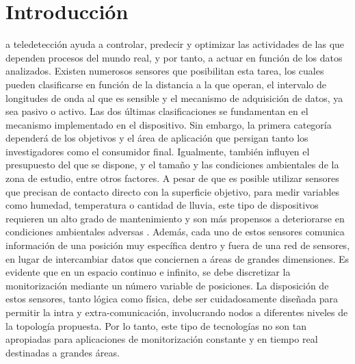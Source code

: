 \setchapterpreamble[u]{\margintoc}
\chapter*{Introducción}
\label{sec:introduction_spanish}

\lettrine[findent=0pt, lines=3]{}{ }a teledetección ayuda a controlar, predecir y optimizar las actividades de las que dependen procesos del mundo real, y por tanto, a actuar en función de los datos analizados. Existen numerosos sensores que posibilitan esta tarea, los cuales pueden clasificarse en función de la distancia a la que operan, el intervalo de longitudes de onda al que es sensible y el mecanismo de adquisición de datos, ya sea pasivo o activo. Las dos últimas clasificaciones se fundamentan en el mecanismo implementado en el dispositivo. Sin embargo, la primera categoría dependerá de los objetivos y el área de aplicación que persigan tanto los investigadores como el consumidor final. Igualmente, también influyen el presupuesto del que se dispone, y el tamaño y las condiciones ambientales de la zona de estudio, entre otros factores. A pesar de que es posible utilizar sensores que precisan de contacto directo con la superficie objetivo, para medir variables como humedad, temperatura o cantidad de lluvia, este tipo de dispositivos requieren un alto grado de mantenimiento y son más propensos a deteriorarse en condiciones ambientales adversas \cite{silva_low-cost_2019, morais_versatile_2021}. Además, cada uno de estos sensores comunica información de una posición muy específica dentro y fuera de una red de sensores, en lugar de intercambiar datos que conciernen a áreas de grandes dimensiones. Es evidente que en un espacio continuo e infinito, se debe discretizar la monitorización mediante un número variable de posiciones. La disposición de estos sensores, tanto lógica como física, debe ser cuidadosamente diseñada para permitir la intra y extra-comunicación, involucrando nodos a diferentes niveles de la topología propuesta. Por lo tanto, este tipo de tecnologías no son tan apropiadas para aplicaciones de monitorización constante y en tiempo real destinadas a grandes áreas. 

